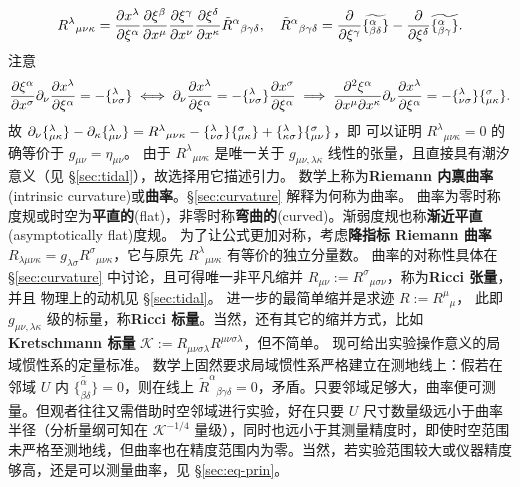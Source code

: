 \[
R^\lambda{}_{\mu\nu\kappa} =\pdv{x^\lambda}{\xi^\alpha}\pdv{\xi^\beta}{x^\mu}\pdv{\xi^\gamma}{x^\nu}\pdv{\xi^\delta}{x^\kappa}\tilde R^\alpha{}_{\beta\gamma\delta},\quad \tilde R^\alpha{}_{\beta\gamma\delta}=\pdv{\xi^\gamma}\widetilde{\{^\alpha_{\beta\delta}\}}-\pdv{\xi^\delta}\widetilde{\{^\alpha_{\beta\gamma}\}}.
\]
注意
\[
\pdv{\xi^\alpha}{x^\sigma} \partial_\nu \pdv{x^\lambda}{\xi^\alpha}
= - \{^\lambda_{\nu\sigma}\} \iff \partial_\nu \pdv{x^\lambda}{\xi^\alpha}
= - \{^\lambda_{\nu\sigma}\} \pdv{x^\sigma}{\xi^\alpha} \implies \pdv{\xi^\alpha}{x^\mu}{x^\kappa} \partial_\nu \pdv{x^\lambda}{\xi^\alpha} = - \{^\lambda_{\nu\sigma}\} \{^\sigma_{\mu\kappa}\}.
\]
故 $\partial_\nu\{^\lambda_{\mu\kappa}\} - \partial_\kappa\{^\lambda_{\mu\nu}\} = R^\lambda{}_{\mu\nu\kappa} - \{^\lambda_{\nu\sigma}\} \{^\sigma_{\mu\kappa}\} + \{^\lambda_{\kappa\sigma}\} \{^\sigma_{\mu\nu}\}$，即
可以证明 $R^\lambda{}_{\mu\nu\kappa}=0$ 的确等价于 $g_{\mu\nu}=\eta_{\mu\nu}$。
由于 $R^\lambda{}_{\mu\nu\kappa}$ 是唯一关于 $g_{\mu\nu,\lambda\kappa}$ 线性的张量，且直接具有潮汐意义（见 \S\ref{sec:tidal}），故选择用它描述引力。
数学上称为\textbf{Riemann 内禀曲率}(intrinsic curvature)或\textbf{曲率}。\S\ref{sec:curvature} 解释为何称为曲率。
曲率为零时称度规或时空为\textbf{平直的}(flat)，非零时称\textbf{弯曲的}(curved)。渐弱度规也称\textbf{渐近平直}(asymptotically flat)度规。
为了让公式更加对称，考虑\textbf{降指标 Riemann 曲率} $R_{\lambda\mu\nu\kappa}=g_{\lambda\sigma}{R^\sigma}_{\mu\nu\kappa}$，它与原先 ${R^\lambda}_{\mu\nu\kappa}$ 有等价的独立分量数。
曲率的对称性具体在 \S\ref{sec:curvature} 中讨论，且可得唯一非平凡缩并 $R_{\mu\nu}:={R^\sigma}_{\mu\sigma\nu}$，称为\textbf{Ricci 张量}，并且
物理上的动机见 \S\ref{sec:tidal}。
进一步的最简单缩并是求迹 $R:=R^\mu{}_\mu$，
此即 $g_{\mu\nu,\lambda\kappa}$ 级的标量，称\textbf{Ricci 标量}。当然，还有其它的缩并方式，比如\textbf{Kretschmann 标量} $\mathcal K:=R_{\mu\nu\sigma\lambda}R^{\mu\nu\sigma\lambda}$，但不简单。
现可给出实验操作意义的局域惯性系的定量标准。
数学上固然要求局域惯性系严格建立在测地线上：假若在邻域 $U$ 内 $\widetilde{\{^\alpha_{\beta\delta}\}}=0$，则在线上 $\tilde R^\alpha{}_{\beta\gamma\delta}=0$，矛盾。只要邻域足够大，曲率便可测量。但观者往往又需借助时空邻域进行实验，好在只要 $U$ 尺寸数量级远小于曲率半径（分析量纲可知在 $\mathcal K^{-1/4}$ 量级），同时也远小于其测量精度时，即使时空范围未严格至测地线，但曲率也在精度范围内为零。当然，若实验范围较大或仪器精度够高，还是可以测量曲率，见 \S\ref{sec:eq-prin}。

